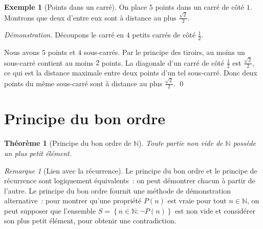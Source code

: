 \documentclass[12pt,a4paper,openany]{book}
\theoremstyle{definition}
\newtheorem{exemple}[definition]{Exemple}
\theoremstyle{plain}
\newtheorem{theoreme}[definition]{Théorème}
\theoremstyle{remark}
\newtheorem{remarque}[definition]{Remarque}
\newcommand{\N}{\mathbb{N}}
\newcommand{\set}[1]{\left\{#1\right\}}
\begin{document}
\begin{exemple}[Points dans un carr\'e]\label{ex:points-carre}
  On place $5$ points dans un carr\'e de c\^ot\'e $1$. Montrons que deux d'entre eux sont \`a distance au plus $\frac{\sqrt{2}}{2}$.

  \smallskip
  \noindent\textit{D\'emonstration.} D\'ecoupons le carr\'e en $4$ petits carr\'es de c\^ot\'e $\frac{1}{2}$.

  \begin{center}
  \end{center}

  Nous avons $5$ points et $4$ sous-carr\'es. Par le principe des tiroirs, au moins un sous-carr\'e contient au moins $2$ points. La diagonale d'un carr\'e de c\^ot\'e $\frac{1}{2}$ est $\frac{\sqrt{2}}{2}$, ce qui est la distance maximale entre deux points d'un tel sous-carr\'e. Donc deux points du m\^eme sous-carr\'e sont \`a distance au plus $\frac{\sqrt{2}}{2}$. \qed
\end{exemple}

\section{Principe du bon ordre}
\label{sec:bon-ordre}

\begin{theoreme}[Principe du bon ordre de $\N$]\label{thm:bon-ordre}
  Toute partie non vide de $\N$ poss\`ede un plus petit \'el\'ement.
\end{theoreme}

\begin{remarque}[Lien avec la r\'ecurrence]\label{rem:bon-ordre-recurrence}
  Le principe du bon ordre et le principe de r\'ecurrence sont logiquement \'equivalents~: on peut d\'emontrer chacun \`a partir de l'autre. Le principe du bon ordre fournit une m\'ethode de d\'emonstration alternative~: pour montrer qu'une propri\'et\'e $P(n)$ est vraie pour tout $n \in \N$, on peut supposer que l'ensemble $S = \set{n \in \N : \neg P(n)}$ est non vide et consid\'erer son plus petit \'el\'ement, pour obtenir une contradiction.
\end{remarque}
\end{document}
